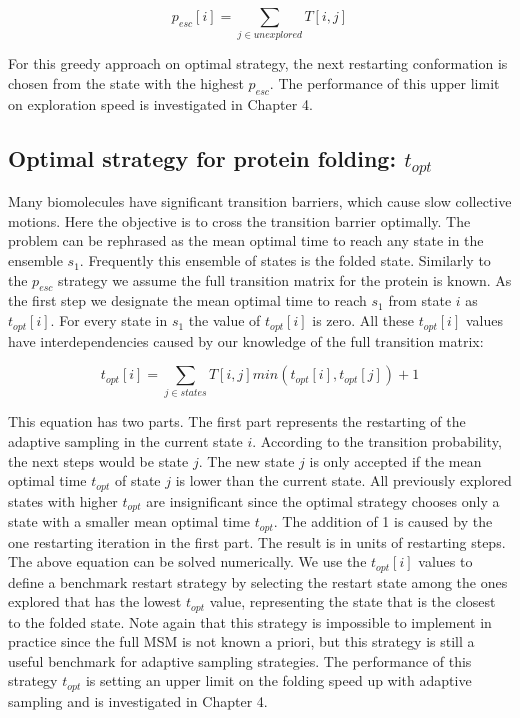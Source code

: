 $$p_{esc}[i]=\sum_{j \in unexplored}T[i, j]$$

For this greedy approach on optimal strategy, the next restarting conformation is chosen from the state with the highest $p_{esc}$. The performance of this upper limit on exploration speed is investigated in Chapter 4.

\subsection{Optimal strategy for protein folding: $t_{opt}$} 

Many biomolecules have significant transition barriers, which cause slow collective motions. Here the objective is to cross the transition barrier optimally.
The problem can be rephrased as the mean optimal time to reach any state in the ensemble  $s_1$. Frequently this ensemble of states is the folded state.  
Similarly to the $p_{esc}$ strategy we assume the full transition matrix for the protein is known. As the first step we designate the mean optimal time to reach $s_1$ from state $i$ as $t_{opt}[i]$.
For every state in $s_1$ the value of  $t_{opt}[i]$ is zero.
All these $t_{opt}[i]$ values have interdependencies caused by our knowledge of the full transition matrix:

$$t_{opt}[i]=\sum_{j \in states}T[i,j]min(t_{opt}[i],t_{opt}[j])+1$$

This equation has two parts. The first part represents the restarting of the adaptive sampling in the current state $i$. According to the transition probability, the next steps would be state $j$. The new state $j$ is only accepted if the mean optimal time $t_{opt}$ of state $j$ is lower than the current state. All previously explored states with higher $t_{opt}$ are insignificant since the optimal strategy chooses only a state with a smaller mean optimal time $t_{opt}$. The addition of 1 is caused by the one restarting iteration in the first part. The result is in units of restarting steps. The above equation can be solved numerically. We use the $t_{opt}[i]$ values to define a benchmark restart strategy by selecting the restart state among the ones explored that has the lowest
$t_{opt}$ value, representing the state that is the closest to the folded
state. Note again that this strategy is impossible to implement in
practice since the full MSM is not known a priori, but this strategy is still a useful benchmark for adaptive sampling strategies. The performance of this strategy $t_{opt}$ is setting an upper limit on the folding speed up with adaptive sampling and is investigated in Chapter 4.


